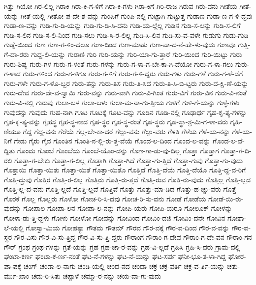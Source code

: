 {ಗಿತ್ತು
ಗಿಯೋ
ಗಿರ-ಲಿಲ್ಲ
ಗಿರಾಕಿ
ಗಿರಾ-ಕಿ-ಗ-ಳಿಗೆ
ಗಿರಾ-ಕಿ-ಗಳು
ಗಿರಾ-ಕಿಗೆ
ಗಿರಿ-ರಾಜ
ಗಿರುವ
ಗಿರು-ವನು
ಗೀತೆಯ
ಗೀತೆ-ಯನ್ನು
ಗೀತೆ-ಯಲ್ಲಿ
ಗೀತೋ-ಪ-ದೇ-ಶ-ವನ್ನು
ಗುಂಪಿಗೆ
ಗುಂಪಿ-ನಲ್ಲಿ
ಗುಟ್ಟಾಗಿ
ಗುಟ್ಟುತ್ತ
ಗುಡಾಣ
ಗುಡಾ-ಣ-ಗ-ಳಿ-ದ್ದವು
ಗುಡಾ-ಣ-ವನ್ನು
ಗುಡಿ-ಗು-ಡಿ-ಯನ್ನು
ಗುಡಿ-ಗು-ಡಿ-ಸಿ-ದನು
ಗುಡಿ-ಯ-ಲ್ಲೆಲ್ಲ
ಗುಡಿಸ
ಗುಡಿ-ಸ-ಲನ್ನು
ಗುಡಿ-ಸ-ಲಿಗೆ
ಗುಡಿ-ಸ-ಲಿನ
ಗುಡಿ-ಸ-ಲಿ-ನಿಂದ
ಗುಡಿ-ಸಲು
ಗುಡಿ-ಸಿ-ರ-ಲಿಲ್ಲ
ಗುಡಿ-ಸಿ-ಲಿನ
ಗುಡಿ-ಸು-ವ-ವಳೇ
ಗುಡುಗು
ಗುಡು-ಗುಡಿ
ಗುಡ್ಡೆ-ಯಿಂದ
ಗುಣ
ಗುಣ-ಗ-ಳಿಂ-ದಲೂ
ಗುಣ-ದಿಂದ
ಗುಣ-ಮಾಡು
ಗುಣ-ವಾ-ದ-ನೆ-ಹೇ-ಳು-ವುದು
ಗುಣವೂ
ಗುತ್ತಿ-ಗೆ-ದಾ-ರರು
ಗುದ್ದ-ಲಿ-ಯನ್ನು
ಗುರಾಣಿ
ಗುರಿ
ಗುರಿ-ಯನ್ನು
ಗುರಿ-ಯಾ-ಗು-ತ್ತಾರೆ
ಗುರಿ-ಯಿಂದ
ಗುರಿ-ಯಿಟ್ಟು
ಗುರು
ಗುರು-ಶಿಷ್ಯ
ಗುರು-ಗಳ
ಗುರು-ಗ-ಳಂತೆ
ಗುರು-ಗಳನ್ನು
ಗುರು-ಗ-ಳಾ-ಗ-ಬೇ-ಕಾ-ಗಿ-ದೆಯೋ
ಗುರು-ಗ-ಳಾ-ಗಲು
ಗುರು-ಗ-ಳಾದ
ಗುರು-ಗಳಿಂದ
ಗುರು-ಗ-ಳಿಗೂ
ಗುರು-ಗ-ಳಿಗೆ
ಗುರು-ಗ-ಳಿ-ದ್ದರು
ಗುರು-ಗಳು
ಗುರು-ಗಳೆ
ಗುರು-ಗ-ಳೆ-ಡೆಗೆ
ಗುರು-ಗಳೇ
ಗುರು-ಗ-ಳೊ-ಬ್ಬರ
ಗುರು-ತನ್ನು
ಗುರು-ತಿಸ
ಗುರು-ತಿ-ಸಿದ
ಗುರು-ತಿ-ಸಿ-ಬಿ-ಟ್ಟರು
ಗುರು-ದ-ಕ್ಷಿ-ಣೆ-ಯನ್ನು
ಗುರು-ದೇವ
ಗುರು-ದೇ-ವ-ಸ್ವಾಮಿ
ಗುರು-ವನ್ನು
ಗುರು-ವಾಗಿ
ಗುರು-ವಿ-ಗಿಂತ
ಗುರು-ವಿಗೆ
ಗುರು-ವಿನ
ಗುರು-ವಿ-ನಂತೆ
ಗುರು-ವಿ-ನಲ್ಲಿ
ಗುರುವು
ಗುಲಾ-ಬಳ
ಗುಲಾ-ಬಳು
ಗುಲಾ-ಮ-ನಾ-ಗು-ತ್ತೀಯ
ಗುಳಿಗೆ
ಗುಳಿ-ಗೆ-ಯನ್ನು
ಗುಳ್ಳೆ-ಗಳು
ಗುವುದನ್ನು
ಗುವುದು
ಗುಹ-ನಾಗಿ
ಗೂಟ
ಗೂಟಕ್ಕೆ
ಗೂಟ-ವನ್ನು
ಗೂಡಿನ
ಗೂಡಿ-ನಲ್ಲಿ
ಗೂಢಾರ್ಥ
ಗೃಹ-ಕೃ-ತ್ಯ-ಗಳನ್ನು
ಗೃಹ-ಕೃ-ತ್ಯ-ವನ್ನು
ಗೃಹಸ್ಥ
ಗೃಹ-ಸ್ಥ-ನಾದ
ಗೃಹ-ಸ್ಥರ
ಗೃಹ-ಸ್ಥ-ರಂತೆ
ಗೃಹ-ಸ್ಥರು
ಗೃಹ-ಸ್ಥಾ-ಶ್ರ-ಮಿ-ಗ-ಳಾ-ದರು
ಗೃಹಿ-ಣಿಯೂ
ಗೆದ್ದ
ಗೆದ್ದ-ವನು
ಗೆರೆಯೆ
ಗೆಲ್ಲ-ಬೇ-ಕಾ-ದರೆ
ಗೆಲ್ಲು-ವನು
ಗೆಲ್ಲು-ವರು
ಗೆಳತಿ
ಗೆಳೆಯ
ಗೆಳೆ-ಯ-ನನ್ನು
ಗೆಳೆ-ಯ-ನಿಗೆ
ಗೇಡು
ಗೈರು
ಗೈವ
ಗೊಂತಿನ
ಗೊಂತಿ-ನ-ಲ್ಲಿ-ರು-ತ್ತ-ವೆಯೆ
ಗೊಂದ-ಲ-ದಿಂದ
ಗೊಂದ-ಲ-ವನ್ನು
ಗೊಂದ-ಲ-ವೆ-ದ್ದಿತು
ಗೊಂದು
ಗೊಂಬೆ
ಗೊಂಬೆಯ
ಗೊಂಬೆ-ಯೊಂ-ದನ್ನು
ಗೊಣ-ಗಾ-ಡು-ವು-ದಿಲ್ಲ
ಗೊತ್ತಾ
ಗೊತ್ತಾಗ
ಗೊತ್ತಾ-ಗ-ದಿ-ರಲಿ
ಗೊತ್ತಾ-ಗ-ಬೇಕು
ಗೊತ್ತಾ-ಗ-ಲಿಲ್ಲ
ಗೊತ್ತಾಗಿ
ಗೊತ್ತಾ-ಗಿದೆ
ಗೊತ್ತಾ-ಗು-ತ್ತಿದೆ
ಗೊತ್ತಾ-ಗುವು
ಗೊತ್ತಾ-ಗು-ವುದು
ಗೊತ್ತಾಯಿ
ಗೊತ್ತಾ-ಯಿತು
ಗೊತ್ತಾ-ಯಿತೆ
ಗೊತ್ತಾ-ಯಿತೊ
ಗೊತ್ತಿದೆ
ಗೊತ್ತಿ-ದೆಯೆ
ಗೊತ್ತಿ-ದೆಯೊ
ಗೊತ್ತಿ-ದ್ದ-ವ-ರಿಗೆ
ಗೊತ್ತಿ-ದ್ದುವು
ಗೊತ್ತಿರ
ಗೊತ್ತಿ-ರ-ಲಿಲ್ಲ
ಗೊತ್ತಿರು
ಗೊತ್ತಿ-ರು-ತ್ತದೆ
ಗೊತ್ತಿ-ರುವ
ಗೊತ್ತಿ-ರು-ವುದು
ಗೊತ್ತಿಲ್ಲ
ಗೊತ್ತಿ-ಲ್ಲದ
ಗೊತ್ತಿ-ಲ್ಲ-ದ-ವನು
ಗೊತ್ತಿ-ಲ್ಲದೆ
ಗೊತ್ತಿ-ಲ್ಲವೆ
ಗೊತ್ತಿವೆ
ಗೊತ್ತು
ಗೊತ್ತು-ಮಾ-ಡಿದ
ಗೊತ್ತು-ಹ-ಚ್ಚು-ವರು
ಗೊತ್ತೆ
ಗೊರಕೆ
ಗೊಲ್ಲ
ಗೊಲ್ಲರು
ಗೊಳೋ
ಗೋಚ-ರಿ-ಸಿ-ದವು
ಗೋಚ-ರಿ-ಸು-ವನು
ಗೋಡೆ
ಗೋಡೆಯ
ಗೋಡೆ-ಯಿ-ರು-ವುದನ್ನು
ಗೋಪಾಲ
ಗೋಪಾ-ಲನ
ಗೋಪಾ-ಲ-ನನ್ನು
ಗೋಪಿ-ಯರು
ಗೋಪಿ-ಯರೂ
ಗೋಲೂಕ್
ಗೋಳನ್ನು
ಗೋಳಾ-ಡು-ತ್ತಿ-ದ್ದಳು
ಗೋಳು
ಗೋಳೋ
ಗೋವನ್ನು
ಗೋವಿಂದ
ಗೋವಿಂ-ದಜಿ
ಗೋವಿಂ-ದನೇ
ಗೋವಿನ
ಗೋಶಾ-ಲೆ-ಯಲ್ಲಿ
ಗೋಸ್ವಾ-ಮಿಯ
ಗೋಹತ್ಯಾ
ಗೌತಮ
ಗೌತಮ್
ಗೌರವ
ಗೌರ-ವಕ್ಕೆ
ಗೌರ-ವ-ದಿಂದ
ಗೌರ-ವ-ವನ್ನು
ಗೌರ-ವ-ಸ್ಥರ
ಗೌರ-ವಿಸು
ಗೌರ-ವಿ-ಸು-ತ್ತಿದ್ದ
ಗೌರ-ವಿ-ಸು-ತ್ತಿ-ದ್ದರು
ಗೌರಾಂಗ
ಗೌರಾಂ-ಗ-ದೇವ
ಗೌರಾಂ-ಗ-ದೇ-ವನ
ಗೌರಾಂ-ಗನ
ಗೌರ್
ಗ್ರಂಥ
ಗ್ರಂಥ-ಗಳನ್ನು
ಗ್ರತೆ-ಯನ್ನು
ಗ್ರಹ
ಗ್ರಹ-ಚಾ-ರ-ವನ್ನು
ಗ್ರಹ-ವಿ-ಲ್ಲದೆ
ಗ್ರಹಿಸಿ
ಗ್ರಹಿ-ಸಿ-ದರು
ಗ್ರಾಮ-ದಲ್ಲಿ
ಘಂಟಾ-ಕರ್ಣ
ಘಂಟಾ-ಕ-ರ್ಣ-ನಂತೆ
ಘಟ-ನೆ-ಗಳನ್ನು
ಘಟ-ನೆ-ಯನ್ನು
ಘಟ-ಸರ್ಪ
ಘನೀ-ಭೂ-ತ-ಳಾ-ಗಿದ್ದ
ಘೋರ-ಪಾ-ಪಕ್ಕೆ
ಚಂಗ್
ಚಂಡಾ-ಲ-ನಾಗು
ಚಂಡಿ-ಯಲ್ಲಿ
ಚಂದ-ನದ
ಚಂದಾ
ಚಕ್ರ
ಚಕ್ರ-ವರ್ತಿ
ಚಕ್ರ-ವ-ರ್ತಿ-ಯನ್ನು
ಚತು-ರ್ಮು-ಖಾಂ
ಚದು-ರಿ-ಸಿತು
ಚಪ್ಪಾಳೆ
ಚಮ್ಮಾ-ರ-ನನ್ನು
ಚಯ-ವಾ-ಗು-ವುದು
}
